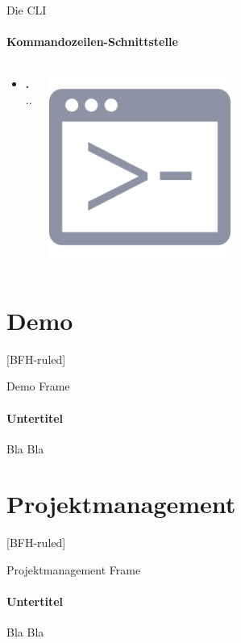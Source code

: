 \documentclass[
	ngerman,%
	authorontitle=true,
	]{bfhbeamer}
\begin{document}
\begin{frame}{Die CLI}
	\framesubtitle{Kommandozeilen-Schnittstelle}
	\begin{columns}
		\begin{column}{0.7\textwidth}
			\begin{itemize}
				\item \textbf ...
			\end{itemize}
		\end{column}
		\begin{column}{0.3\textwidth}
			\begin{center}
				\includegraphics[width=0.5\textwidth]{assets/presentation/prompt}
			\end{center}
		\end{column}
	\end{columns}

\end{frame}

\section{Demo}\label{sec:demo}
[BFH-ruled]
\frame{\sectionpage}

\begin{frame}{Demo Frame}
	\framesubtitle{Untertitel}
	Bla Bla
\end{frame}

\section{Projektmanagement}\label{sec:projektmanagement}
[BFH-ruled]
\frame{\sectionpage}

\begin{frame}{Projektmanagement Frame}
	\framesubtitle{Untertitel}
	Bla Bla
\end{frame}
\end{document}
